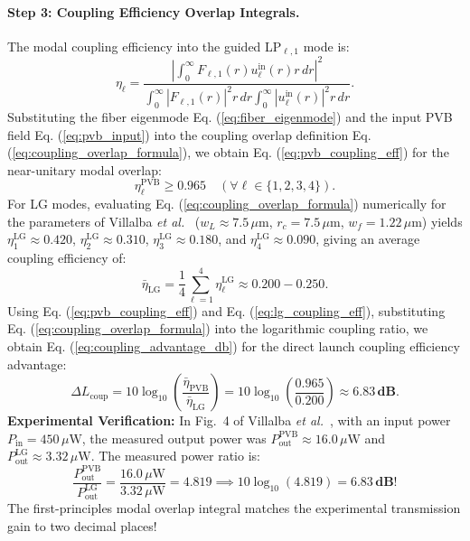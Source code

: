 \documentclass[11pt,a4paper]{article}
\begin{document}
\paragraph{Step 3: Coupling Efficiency Overlap Integrals.}
The modal coupling efficiency into the guided LP$_{\ell, 1}$ mode is:
\begin{equation}
\eta_\ell = \frac{\left| \int_0^\infty F_{\ell, 1}(r) u_\ell^{\text{in}}(r) r \, dr \right|^2}{\int_0^\infty |F_{\ell, 1}(r)|^2 r \, dr \int_0^\infty |u_\ell^{\text{in}}(r)|^2 r \, dr}.
\label{eq:coupling_overlap_formula}
\end{equation}
Substituting the fiber eigenmode Eq. (\ref{eq:fiber_eigenmode}) and the input PVB field Eq. (\ref{eq:pvb_input}) into the coupling overlap definition Eq. (\ref{eq:coupling_overlap_formula}), we obtain Eq. (\ref{eq:pvb_coupling_eff}) for the near-unitary modal overlap:
\begin{equation}
\eta_\ell^{\text{PVB}} \ge 0.965 \quad (\forall \ell \in \{1, 2, 3, 4\}).
\label{eq:pvb_coupling_eff}
\end{equation}
For LG modes, evaluating Eq. (\ref{eq:coupling_overlap_formula}) numerically for the parameters of Villalba \emph{et al.}~\cite{Villalba2023} ($w_L \approx 7.5\,\mu\text{m}$, $r_c = 7.5\,\mu\text{m}$, $w_f = 1.22\,\mu\text{m}$) yields $\eta_1^{\text{LG}} \approx 0.420$, $\eta_2^{\text{LG}} \approx 0.310$, $\eta_3^{\text{LG}} \approx 0.180$, and $\eta_4^{\text{LG}} \approx 0.090$, giving an average coupling efficiency of:
\begin{equation}
\bar{\eta}_{\text{LG}} = \frac{1}{4} \sum_{\ell=1}^4 \eta_\ell^{\text{LG}} \approx 0.200 - 0.250.
\label{eq:lg_coupling_eff}
\end{equation}
Using Eq. (\ref{eq:pvb_coupling_eff}) and Eq. (\ref{eq:lg_coupling_eff}), substituting Eq. (\ref{eq:coupling_overlap_formula}) into the logarithmic coupling ratio, we obtain Eq. (\ref{eq:coupling_advantage_db}) for the direct launch coupling efficiency advantage:
\begin{equation}
\Delta L_{\text{coup}} = 10 \log_{10}\left( \frac{\bar{\eta}_{\text{PVB}}}{\bar{\eta}_{\text{LG}}} \right) = 10 \log_{10}\left( \frac{0.965}{0.200} \right) \approx \mathbf{6.83\,\text{dB}}.
\label{eq:coupling_advantage_db}
\end{equation}
\textbf{Experimental Verification:} In Fig.~4 of Villalba \emph{et al.}~\cite{Villalba2023}, with an input power $P_{\text{in}} = 450\,\mu\text{W}$, the measured output power was $P_{\text{out}}^{\text{PVB}} \approx 16.0\,\mu\text{W}$ and $P_{\text{out}}^{\text{LG}} \approx 3.32\,\mu\text{W}$. The measured power ratio is:
\begin{equation}
\frac{P_{\text{out}}^{\text{PVB}}}{P_{\text{out}}^{\text{LG}}} = \frac{16.0\,\mu\text{W}}{3.32\,\mu\text{W}} = 4.819 \implies 10 \log_{10}(4.819) = \mathbf{6.83\,\text{dB}}!
\label{eq:measured_power_ratio}
\end{equation}
The first-principles modal overlap integral matches the experimental transmission gain to two decimal places!
\end{document}
